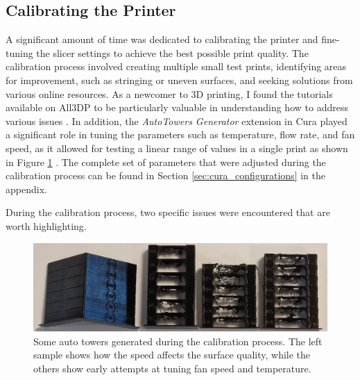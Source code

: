 \subsection{Calibrating the Printer}

A significant amount of time was dedicated to calibrating the printer and fine-tuning the slicer settings to achieve the best possible print quality.
The calibration process involved creating multiple small test prints, identifying areas for improvement, such as stringing or uneven surfaces, and seeking solutions from various online resources.
As a newcomer to 3D printing, I found the tutorials available on All3DP to be particularly valuable in understanding how to address various issues \cite{all3dpBasicsArchives}.
In addition, the \textit{AutoTowers Generator} extension in Cura played a significant role in tuning the parameters such as temperature, flow rate, and fan speed, as it allowed for testing a linear range of values in a single print as shown in Figure \ref{fig:auto_towers} \cite{kartchnerAutoTowersGeneratorUltimaker2022}.
The complete set of parameters that were adjusted during the calibration process can be found in Section \ref{sec:cura_configurations} in the appendix.

During the calibration process, two specific issues were encountered that are worth highlighting.

\begin{figure}[H]
    \centering
    \includegraphics[width=\textwidth]{figures/3d_print/auto_towers.jpg}
    \caption{Some auto towers generated during the calibration process.
        The left sample shows how the speed affects the surface quality, while the others show early attempts at tuning fan speed and temperature.}
    \label{fig:auto_towers}
\end{figure}


